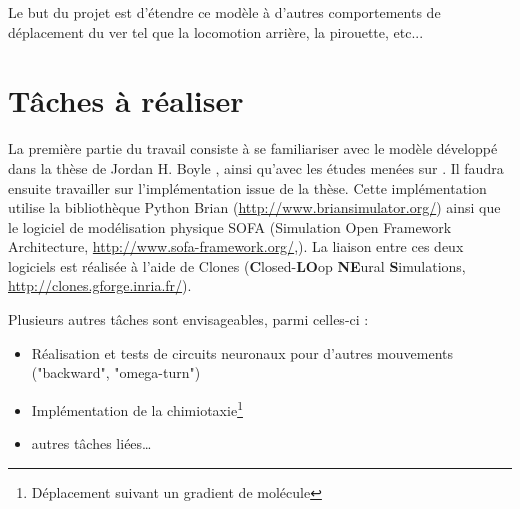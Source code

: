 Le but du projet est d'étendre ce modèle à d'autres comportements de déplacement du ver tel que la locomotion arrière, la pirouette, etc...


\section{Tâches à réaliser} %
\label{sec:Tâches à réaliser}

La première partie du travail consiste à se familiariser avec le modèle développé dans la thèse de Jordan
H. Boyle \cite{Boyle2009}, ainsi qu'avec les études menées sur \celeg{}. Il faudra ensuite travailler sur
l'implémentation issue de la thèse. Cette implémentation utilise la bibliothèque Python Brian
(\url{http://www.briansimulator.org/}) ainsi que le logiciel de modélisation physique SOFA
(Simulation Open Framework Architecture, \url{http://www.sofa-framework.org/},\cite{Allard2007}). La liaison entre ces
deux logiciels est réalisée à l'aide de Clones (\textbf{C}losed-\textbf{LO}op \textbf{NE}ural \textbf{S}imulations,\\
\url{http://clones.gforge.inria.fr/}).

Plusieurs autres tâches sont envisageables, parmi celles-ci :
\begin{itemize}
   \item Réalisation et tests de circuits neuronaux pour d'autres mouvements ("backward", "omega-turn")
   \item Implémentation de la chimiotaxie\footnote{Déplacement suivant un gradient de molécule}
   \item autres tâches liées\dots
\end{itemize}




